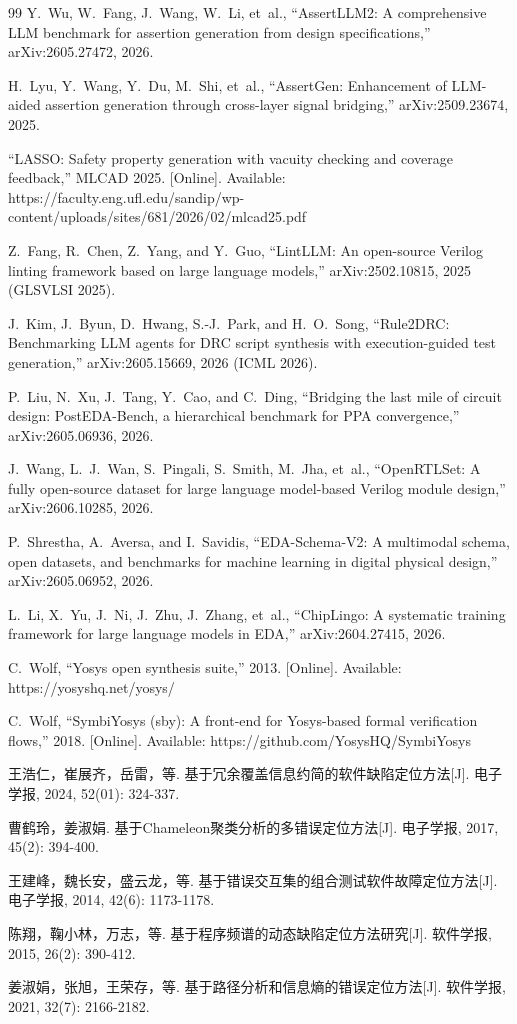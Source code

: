 \documentclass[journal]{IEEEtran}
\begin{document}
\begin{thebibliography}{99}
Y.~Wu, W.~Fang, J.~Wang, W.~Li, et~al., ``AssertLLM2: A comprehensive LLM benchmark for assertion generation from design specifications,'' arXiv:2605.27472, 2026.

H.~Lyu, Y.~Wang, Y.~Du, M.~Shi, et~al., ``AssertGen: Enhancement of LLM-aided assertion generation through cross-layer signal bridging,'' arXiv:2509.23674, 2025.

``LASSO: Safety property generation with vacuity checking and coverage feedback,'' MLCAD 2025. [Online]. Available: https://faculty.eng.ufl.edu/sandip/wp-content/uploads/sites/681/2026/02/mlcad25.pdf

Z.~Fang, R.~Chen, Z.~Yang, and Y.~Guo, ``LintLLM: An open-source Verilog linting framework based on large language models,'' arXiv:2502.10815, 2025 (GLSVLSI 2025).

J.~Kim, J.~Byun, D.~Hwang, S.-J.~Park, and H.~O.~Song, ``Rule2DRC: Benchmarking LLM agents for DRC script synthesis with execution-guided test generation,'' arXiv:2605.15669, 2026 (ICML 2026).

P.~Liu, N.~Xu, J.~Tang, Y.~Cao, and C.~Ding, ``Bridging the last mile of circuit design: PostEDA-Bench, a hierarchical benchmark for PPA convergence,'' arXiv:2605.06936, 2026.

J.~Wang, L.~J.~Wan, S.~Pingali, S.~Smith, M.~Jha, et~al., ``OpenRTLSet: A fully open-source dataset for large language model-based Verilog module design,'' arXiv:2606.10285, 2026.

P.~Shrestha, A.~Aversa, and I.~Savidis, ``EDA-Schema-V2: A multimodal schema, open datasets, and benchmarks for machine learning in digital physical design,'' arXiv:2605.06952, 2026.

L.~Li, X.~Yu, J.~Ni, J.~Zhu, J.~Zhang, et~al., ``ChipLingo: A systematic training framework for large language models in EDA,'' arXiv:2604.27415, 2026.

C.~Wolf, ``Yosys open synthesis suite,'' 2013. [Online]. Available: https://yosyshq.net/yosys/

C.~Wolf, ``SymbiYosys (sby): A front-end for Yosys-based formal verification flows,'' 2018. [Online]. Available: https://github.com/YosysHQ/SymbiYosys

王浩仁，崔展齐，岳雷，等. 基于冗余覆盖信息约简的软件缺陷定位方法[J]. 电子学报, 2024, 52(01): 324-337.

曹鹤玲，姜淑娟. 基于Chameleon聚类分析的多错误定位方法[J]. 电子学报, 2017, 45(2): 394-400.

王建峰，魏长安，盛云龙，等. 基于错误交互集的组合测试软件故障定位方法[J]. 电子学报, 2014, 42(6): 1173-1178.

陈翔，鞠小林，万志，等. 基于程序频谱的动态缺陷定位方法研究[J]. 软件学报, 2015, 26(2): 390-412.

姜淑娟，张旭，王荣存，等. 基于路径分析和信息熵的错误定位方法[J]. 软件学报, 2021, 32(7): 2166-2182.

\end{thebibliography}
\end{document}
